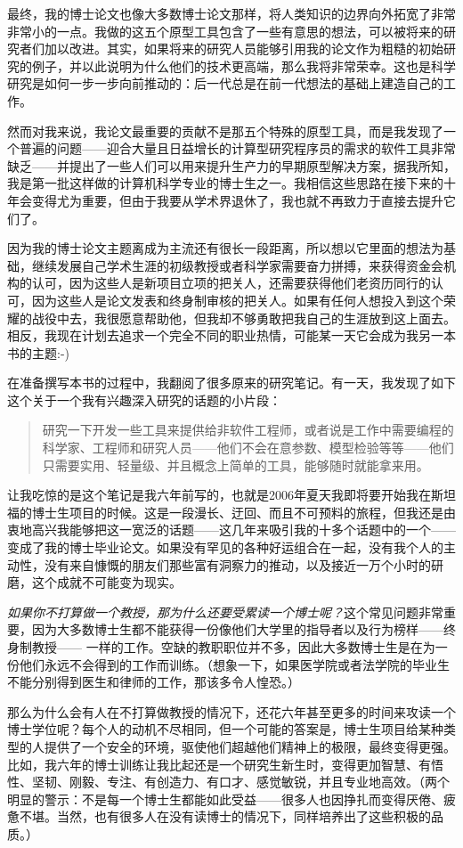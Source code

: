 \documentclass[letter,12pt]{book}
\begin{document}
\begin{CJK}{UTF8}{gbsn}
最终，我的博士论文也像大多数博士论文那样，将人类知识的边界向外拓宽了非常非常小的一点。我做的这五个原型工具包含了一些有意思的想法，可以被将来的研究者们加以改进。其实，如果将来的研究人员能够引用我的论文作为粗糙的初始研究的例子，并以此说明为什么他们的技术更高端，那么我将非常荣幸。这也是科学研究是如何一步一步向前推动的：后一代总是在前一代想法的基础上建造自己的工作。

然而对我来说，我论文最重要的贡献不是那五个特殊的原型工具，而是我发现了一个普遍的问题——迎合大量且日益增长的计算型研究程序员的需求的软件工具非常缺乏——并提出了一些人们可以用来提升生产力的早期原型解决方案，据我所知，我是第一批这样做的计算机科学专业的博士生之一。我相信这些思路在接下来的十年会变得尤为重要，但由于我要从学术界退休了，我也就不再致力于直接去提升它们了。

因为我的博士论文主题离成为主流还有很长一段距离，所以想以它里面的想法为基础，继续发展自己学术生涯的初级教授或者科学家需要奋力拼搏，来获得资金会机构的认可，因为这些人是新项目立项的把关人，还需要获得他们老资历同行的认可，因为这些人是论文发表和终身制审核的把关人。如果有任何人想投入到这个荣耀的战役中去，我很愿意帮助他，但我却不够勇敢把我自己的生涯放到这上面去。相反，我现在计划去追求一个完全不同的职业热情，可能某一天它会成为我另一本书的主题:-)

\breakline

在准备撰写本书的过程中，我翻阅了很多原来的研究笔记。有一天，我发现了如下这个关于一个我有兴趣深入研究的话题的小片段：
\begin{quote}
  研究一下开发一些工具来提供给非软件工程师，或者说是工作中需要编程的科学家、工程师和研究人员——他们不会在意参数、模型检验等等——他们只需要实用、轻量级、并且概念上简单的工具，能够随时就能拿来用。
\end{quote}
让我吃惊的是这个笔记是我六年前写的，也就是2006年夏天我即将要开始我在斯坦福的博士生项目的时候。这是一段漫长、迂回、而且不可预料的旅程，但我还是由衷地高兴我能够把这一宽泛的话题——这几年来吸引我的十多个话题中的一个——变成了我的博士毕业论文。如果没有罕见的各种好运组合在一起，没有我个人的主动性，没有来自慷慨的朋友们那些富有洞察力的推动，以及接近一万个小时的研磨，这个成就不可能变为现实。

\emph{如果你不打算做一个教授，那为什么还要受累读一个博士呢？}这个常见问题非常重要，因为大多数博士生都不能获得一份像他们大学里的指导者以及行为榜样——终身制教授—— 一样的工作。空缺的教职职位并不多，因此大多数博士生是在为一份他们永远不会得到的工作而训练。（想象一下，如果医学院或者法学院的毕业生不能分别得到医生和律师的工作，那该多令人惶恐。）

那么为什么会有人在不打算做教授的情况下，还花六年甚至更多的时间来攻读一个博士学位呢？每个人的动机不尽相同，但一个可能的答案是，博士生项目给某种类型的人提供了一个安全的环境，驱使他们超越他们精神上的极限，最终变得更强。比如，我六年的博士训练让我比起还是一个研究生新生时，变得更加智慧、有悟性、坚韧、刚毅、专注、有创造力、有口才、感觉敏锐，并且专业地高效。（两个明显的警示：不是每一个博士生都能如此受益——很多人也因挣扎而变得厌倦、疲惫不堪。当然，也有很多人在没有读博士的情况下，同样培养出了这些积极的品质。）


\end{CJK}
\end{document}

